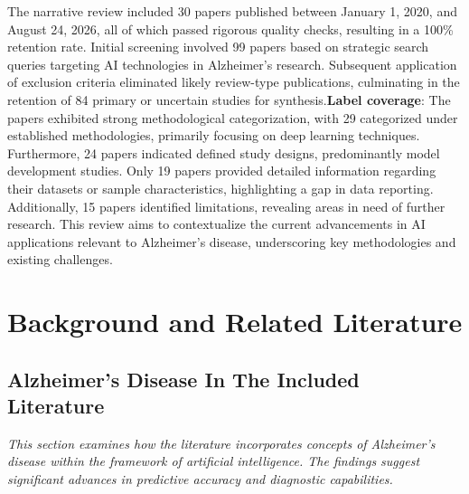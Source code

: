 \documentclass{MITcsail}
\begin{document}
The narrative review included 30 papers published between January 1, 2020, and August 24, 2026, all of which passed rigorous quality checks, resulting in a 100\% retention rate. Initial screening involved 99 papers based on strategic search queries targeting AI technologies in Alzheimer’s research. Subsequent application of exclusion criteria eliminated likely review-type publications, culminating in the retention of 84 primary or uncertain studies for synthesis.\textbf{Label coverage}: The papers exhibited strong methodological categorization, with 29 categorized under established methodologies, primarily focusing on deep learning techniques. Furthermore, 24 papers indicated defined study designs, predominantly model development studies. Only 19 papers provided detailed information regarding their datasets or sample characteristics, highlighting a gap in data reporting. Additionally, 15 papers identified limitations, revealing areas in need of further research. This review aims to contextualize the current advancements in AI applications relevant to Alzheimer’s disease, underscoring key methodologies and existing challenges.

\section{Background and Related Literature}

\subsection{Alzheimer's Disease In The Included Literature}

\textit{This section examines how the literature incorporates concepts of Alzheimer's disease within the framework of artificial intelligence. The findings suggest significant advances in predictive accuracy and diagnostic capabilities.}
\end{document}

